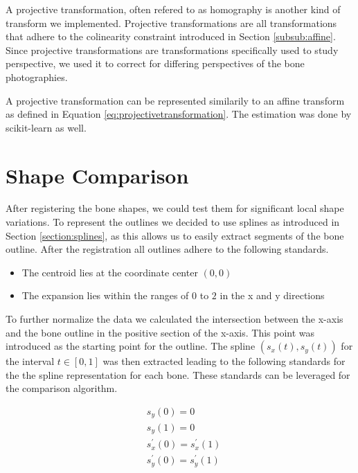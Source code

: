 \documentclass[pdftex,12pt,a4paper]{report}
\begin{document}
A projective transformation, often refered to as homography is another kind of transform we implemented.
Projective transformations are all transformations that adhere to the colinearity constraint introduced
in Section \ref{subsub:affine}. Since projective transformations are transformations specifically used
to study perspective, we used it to correct for differing perspectives of the bone photographies.

A projective transformation can be represented similarily to an affine transform as defined in Equation
\ref{eq:projectivetransformation}. The estimation was done by scikit-learn \cite{van2014scikit} as well. 

\section{Shape Comparison}

After registering the bone shapes, we could test them for significant local shape variations.
To represent the outlines we decided to use splines as introduced in Section \ref{section:splines},
as this allows us to easily extract segments of the bone outline. After the registration all outlines
adhere to the following standards.

\begin{itemize}
\item The centroid lies at the coordinate center $(0,0)$
\item The expansion lies within the ranges of $0$ to $2$ in the x and y directions
\end{itemize}

To further normalize the data we calculated the intersection between the x-axis and the bone outline
in the positive section of the x-axis. This point was introduced as the starting point for the outline.
The spline $(s_x(t), s_y(t))$ for the interval $t \in [0, 1]$ was then extracted leading to the
following standards for the the spline representation for each bone. These standards can be leveraged for the comparison algorithm.

\begin{equation}
\begin{split}
& s_y(0) = 0 \\
& s_y(1) = 0 \\
& s_x^\prime(0) = s_x^\prime(1) \\
& s_y^\prime(0) = s_y^\prime(1)
\end{split}
\end{equation}
\end{document}
